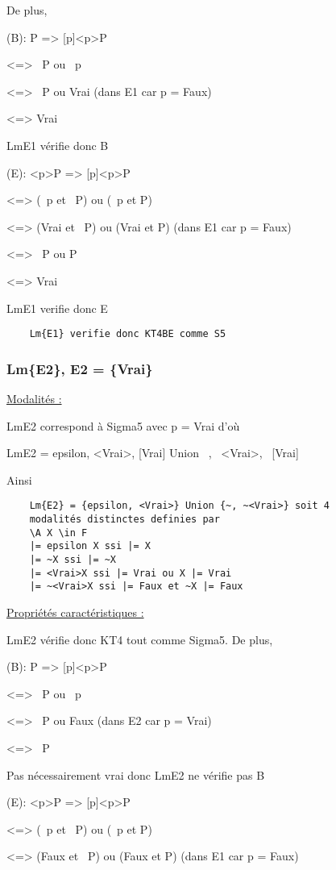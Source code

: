 \documentclass[a4paper,10pt]{article}
\begin{document}
De plus,

	(B): P => [p]<p>P 
	
	<=> ~P ou ~p
	
	<=> ~P ou Vrai (dans E1 car p = Faux)
	
	<=> Vrai
	
	Lm{E1} vérifie donc B

	(E): <p>P => [p]<p>P
	
	<=> (~p et ~P) ou (~p et P)
	
	<=> (Vrai et ~P) ou (Vrai et P)   (dans E1 car p = Faux)
	
        <=> ~P ou P
        
	<=> Vrai
	
	Lm{E1} verifie donc E
	
\begin{lstlisting}
	Lm{E1} verifie donc KT4BE comme S5
\end{lstlisting}

   \subsubsection{Lm\{E2\}, E2 = \{Vrai\}}
     
	\underline{Modalités :}
	
Lm{E2} correspond à Sigma5 avec p = Vrai d'où

Lm{E2} = {epsilon, <Vrai>, [Vrai]} Union {~, ~<Vrai>, ~[Vrai]}
	
Ainsi
\begin{lstlisting}
	Lm{E2} = {epsilon, <Vrai>} Union {~, ~<Vrai>} soit 4 
	modalités distinctes definies par 
	\A X \in F
	|= epsilon X ssi |= X
	|= ~X ssi |= ~X
	|= <Vrai>X ssi |= Vrai ou X |= Vrai
	|= ~<Vrai>X ssi |= Faux et ~X |= Faux
\end{lstlisting}
	
	\underline{Propriétés caractéristiques :}
	
Lm{E2} vérifie donc KT4 tout comme Sigma5. De plus,
	
	(B): P => [p]<p>P 
	
	<=> ~P ou ~p
	
	<=> ~P ou Faux (dans E2 car p = Vrai)
	
	<=> ~P
	
	Pas nécessairement vrai donc Lm{E2} ne vérifie pas B

	(E): <p>P => [p]<p>P
	
	<=> (~p et ~P) ou (~p et P)
	
	<=> (Faux et ~P) ou (Faux et P)   (dans E1 car p = Faux)
	
\end{document}
